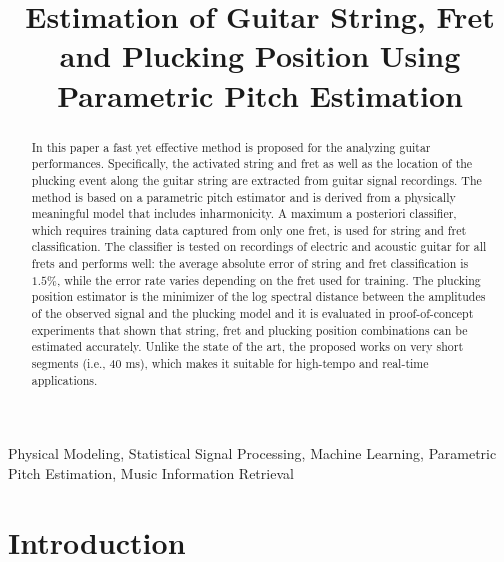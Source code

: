 \documentclass{article}
\title{Estimation of Guitar String, Fret and Plucking Position Using Parametric Pitch Estimation}
\begin{document}
\ninept
\maketitle
%
%
%
%
\begin{abstract}
In this paper a fast yet effective method is proposed for the analyzing guitar performances. Specifically, the activated string and fret as well as the location of the plucking event along the guitar string are extracted from guitar signal recordings. The method is based on a parametric pitch estimator and is derived from a physically meaningful model that includes inharmonicity. A maximum a posteriori classifier, which requires training data captured from only one fret, is used for string and fret classification. The classifier is tested on recordings of electric and acoustic guitar for all frets and performs well: the average absolute error of string and fret classification is $1.5\%$, while the error rate varies depending on the fret used for training. The plucking position estimator is the minimizer of the log spectral distance between the amplitudes of the observed signal and the plucking model and it is evaluated in proof-of-concept experiments that shown that string, fret and plucking position combinations can be estimated accurately. Unlike the state of the art, the proposed works on very short segments (i.e., 40 ms), which makes it suitable for high-tempo and real-time applications.
\end{abstract}
%
\begin{keywords}
 Physical Modeling, Statistical Signal Processing, Machine Learning, Parametric Pitch Estimation, Music Information Retrieval\vspace{-.8mm}
\end{keywords}
%
%
%
%
%
%
%
%
% 
% 
%
\section{Introduction} %
\label{sec:introduction}
\vspace{-.6mm}
%
\end{document}
